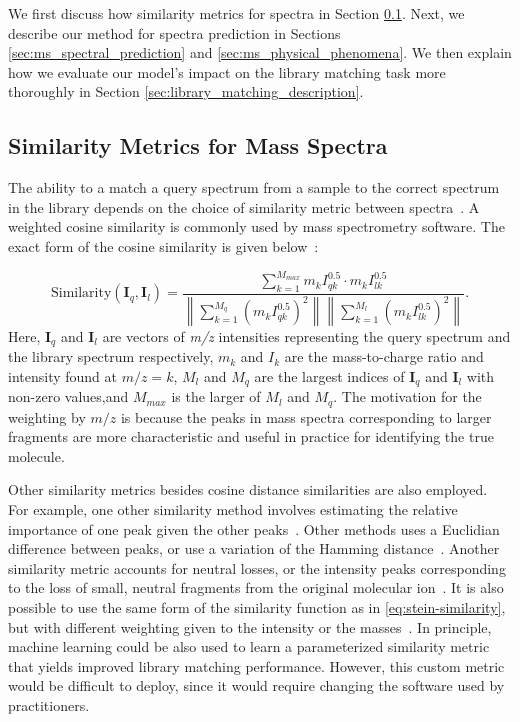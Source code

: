 We first discuss how similarity metrics for spectra in Section \ref{sec:similarity_discussion}. Next, we describe our method for spectra prediction in Sections \ref{sec:ms_spectral_prediction} and \ref{sec:ms_physical_phenomena}. We then explain how we evaluate our model's impact on the library matching task more thoroughly in Section \ref{sec:library_matching_description}.


\subsection{Similarity Metrics for Mass Spectra}\label{sec:similarity_discussion}

The ability to a match a query spectrum from a sample to the correct spectrum in the library depends on the choice of similarity metric between spectra~\cite{mclafferty1974probability,stein1994optimization}.
A weighted cosine similarity is commonly used by mass spectrometry software. The exact form of the cosine similarity is given below~\cite{stein1994optimization}:

\begin{equation}\label{eq:stein-similarity}
\text{Similarity}(\boldsymbol{I}_q, \boldsymbol{I}_l) = \frac{\sum_{k=1}^{M_{max}} m_{k} I_{qk}^{0.5} \cdot m_{k} I_{lk}^{0.5}}{\left\lVert\sum_{k=1}^{M_q} (m_{k} I_{qk}^{0.5})^2\right\rVert \left\lVert\sum_{k=1}^{M_l} (m_{k} I_{lk}^{0.5})^2\right\rVert}.
\end{equation}
Here, {$\boldsymbol{I}_q$} and {$\boldsymbol{I}_l$} are vectors of \textit{m/z} intensities representing the query spectrum and the library spectrum respectively, $m_k$ and $I_k$ are the mass-to-charge ratio and intensity found at $m/z = k$, $M_l$ and $M_q$ are the largest indices of $\boldsymbol{I}_q$ and $\boldsymbol{I}_l$ with non-zero values,and $M_{max}$ is the larger of $M_l$ and $M_q$. The motivation for the weighting by $m/z$ is because the peaks in mass spectra corresponding to larger fragments are more characteristic and useful in practice for identifying the true molecule.

Other similarity metrics besides cosine distance similarities are also employed. For example, one other similarity method involves estimating the relative importance of one peak given the other peaks~\cite{mclafferty1974probability}. Other methods uses a Euclidian difference between peaks, or use a variation of the Hamming distance~\cite{stein1994optimization,hertz1971identification}. Another similarity metric accounts for neutral losses, or the intensity peaks corresponding to the loss of small, neutral fragments from the original molecular ion~\cite{moorthy2017combining}. It is also possible to use the same form of the similarity function as in \eqref{eq:stein-similarity}, but with different weighting given to the intensity or the masses~\cite{stein1994optimization}. In principle, machine learning could be also used to learn a parameterized similarity metric that yields improved library matching performance. However, this custom metric would be difficult to deploy, since it would require changing the software used by practitioners.


